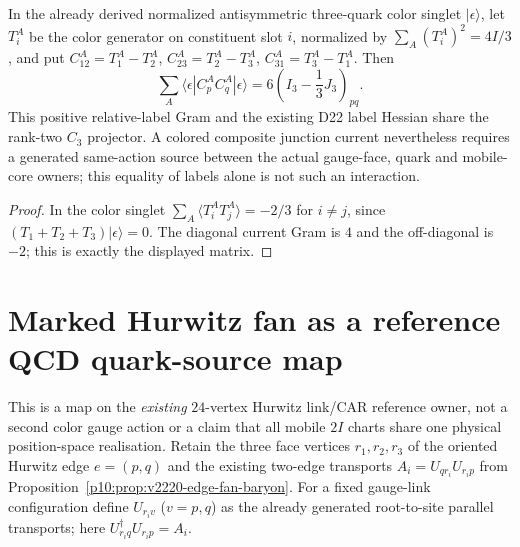 \documentclass[12pt,a4paper]{article}
\begin{document}
\begin{proposition}
\label{p10:prop:v1173-three-core-color-current-gram}
In the already derived normalized antisymmetric three-quark color
singlet $|\epsilon\rangle$, let $T_i^A$ be the color generator
on constituent slot $i$, normalized by
$\sum_A(T_i^A)^2=4I/3$, and put
$C_{12}^A=T_1^A-T_2^A$, $C_{23}^A=T_2^A-T_3^A$,
$C_{31}^A=T_3^A-T_1^A$.  Then
\[
 \boxed{\sum_A\langle\epsilon|C_p^AC_q^A|\epsilon\rangle
       =6\left(I_3-\frac13J_3\right)_{pq}.}
\]
This positive relative-label Gram and the existing D22 label
Hessian share the rank-two $C_3$ projector.  A colored composite
junction current nevertheless requires a generated same-action
source between the actual gauge-face, quark and mobile-core owners;
this equality of labels alone is not such an interaction.
\end{proposition}
\begin{proof}
In the color singlet $\sum_A\langle T_i^AT_j^A\rangle=-2/3$
for $i\ne j$, since $(T_1+T_2+T_3)|\epsilon\rangle=0$.
The diagonal current Gram is $4$ and the off-diagonal is $-2$;
this is exactly the displayed matrix.
\end{proof}


\section{Marked Hurwitz fan as a reference QCD quark-source map}
\label{p10:sec:v3023-marked-fan-source-map}
This is a map on the \emph{existing} $24$-vertex Hurwitz link/CAR
reference owner, not a second color gauge action or a claim that all
mobile $2I$ charts share one physical position-space realisation.
Retain the three face vertices $r_1,r_2,r_3$ of the oriented Hurwitz
edge $e=(p,q)$ and the existing two-edge transports
$A_i=U_{qr_i}U_{r_ip}$ from
Proposition~\ref{p10:prop:v2220-edge-fan-baryon}.
For a fixed gauge-link configuration define $U_{r_iv}$ ($v=p,q$)
as the already generated root-to-site parallel transports; here
$U_{r_iq}^{\dagger}U_{r_ip}=A_i$.
\end{document}
